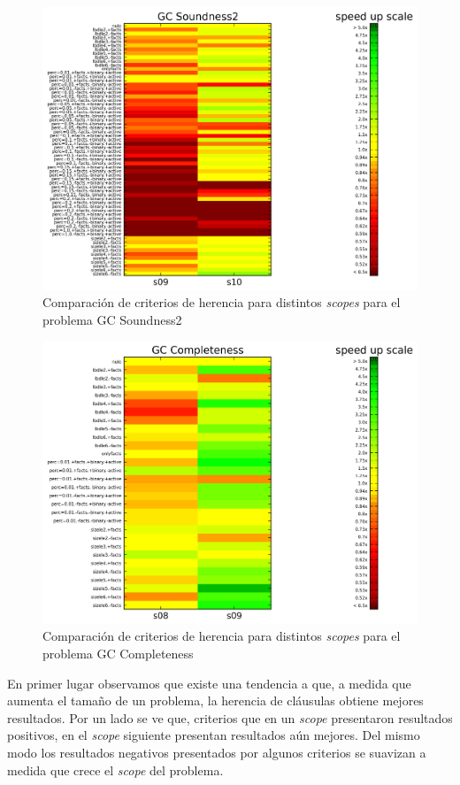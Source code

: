 \begin{figure}
	\includegraphics[width=\textwidth]{resultados/lossound_heat.png}
	\caption{Comparación de criterios de herencia para distintos \emph{scopes} para el problema GC Soundness2}
	\label{res:learnscopessoundness}
\end{figure}

\begin{figure}
	\includegraphics[width=\textwidth]{resultados/loscomp_heat.png}
	\caption{Comparación de criterios de herencia para distintos \emph{scopes} para el problema GC Completeness}
	\label{res:learnscopescompleteness}
\end{figure}

En primer lugar observamos que existe una tendencia a que, a medida que
aumenta el tamaño de un problema, la herencia de cláusulas obtiene mejores
resultados. Por un lado se ve que, criterios que en un \emph{scope}
presentaron resultados positivos, en el \emph{scope} siguiente presentan
resultados aún mejores. Del mismo modo los resultados negativos presentados
por algunos criterios se suavizan a medida que crece el \emph{scope} del
problema.

